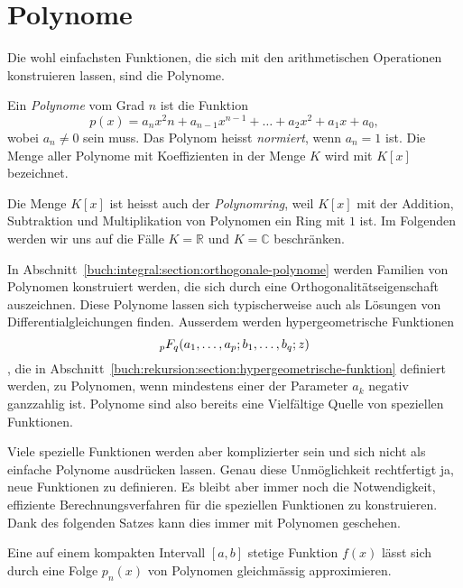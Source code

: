 %
%
%
\section{Polynome
\label{buch:potenzen:section:polynome}}
Die wohl einfachsten Funktionen, die sich mit den arithmetischen
Operationen konstruieren lassen, sind die Polynome.

\begin{definition}
%
Ein {\em Polynome} vom Grad $n$ ist die Funktion
\[
p(x) = a_nx^2n + a_{n-1}x^{n-1} + \dots + a_2x^2 + a_1x + a_0,
\]
wobei $a_n\ne 0$ sein muss.
Das Polynom heisst {\em normiert}, wenn $a_n=1$ ist.
%
Die Menge aller Polynome mit Koeffizienten in der Menge $K$ wird mit
$K[x]$ bezeichnet.
\end{definition}

Die Menge $K[x]$ ist heisst auch der {\em Polynomring}, weil $K[x]$
mit der Addition, Subtraktion und Multiplikation von Polynomen ein
Ring mit $1$ ist.
Im Folgenden werden wir uns auf die Fälle $K=\mathbb{R}$ und $K=\mathbb{C}$
beschränken.

In Abschnitt~\ref{buch:integral:section:orthogonale-polynome} werden
Familien von Polynomen konstruiert werden, die sich durch eine
Orthogonalitätseigenschaft auszeichnen.
Diese Polynome lassen sich typischerweise auch als Lösungen von
Differentialgleichungen finden.
Ausserdem werden hypergeometrische Funktionen
\[
\mathstrut_pF_q(a_1,\dots,a_p;b_1,\dots,b_q;z)
\], die in
Abschnitt~\ref{buch:rekursion:section:hypergeometrische-funktion}
definiert werden, zu Polynomen, wenn mindestens einer der
Parameter $a_k$ negativ ganzzahlig ist.
Polynome sind also bereits eine Vielfältige Quelle von speziellen
Funktionen.

Viele spezielle Funktionen werden aber komplizierter sein und
sich nicht als einfache Polynome ausdrücken lassen.
Genau diese Unmöglichkeit rechtfertigt ja, neue Funktionen
zu definieren.
Es bleibt aber immer noch die Notwendigkeit, effiziente 
Berechnungsverfahren für die speziellen Funktionen zu konstruieren.
Dank des folgenden Satzes kann dies immer mit Polynomen geschehen.

\begin{satz}[Weierstrasse]
Eine auf einem kompakten Intervall $[a,b]$ stetige Funktion $f(x)$
lässt sich durch eine Folge $p_n(x)$ von Polynomen gleichmässig
approximieren.
\end{satz}

